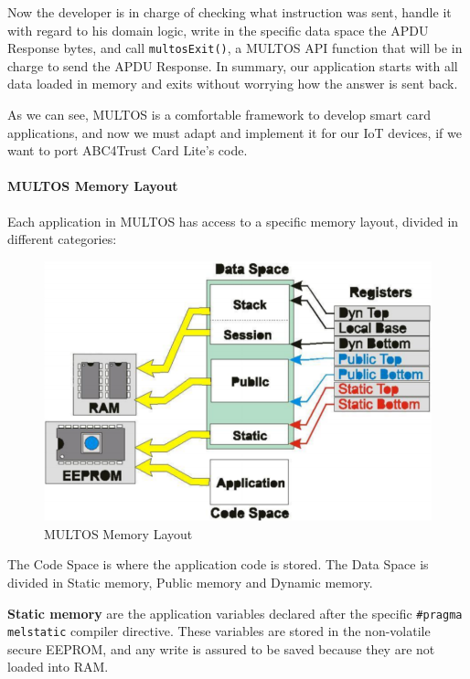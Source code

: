 Now the developer is in charge of checking what instruction was sent, handle it with regard to his domain logic,  write in the specific data space the APDU Response bytes, and call \texttt{multosExit()}, a MULTOS API function that will be in charge to send the APDU Response.
In summary, our application starts with all data loaded in memory and exits without worrying how the answer is sent back.

As we can see, MULTOS is a comfortable framework to develop smart card applications, and now we must adapt and implement it for our IoT devices, if we want to port ABC4Trust Card Lite's code.



\paragraph{MULTOS Memory Layout}

Each application in MULTOS has access to a specific memory layout, divided in different categories:

\begin{figure}[bth]
	\begin{center}
		\includegraphics[width=0.8\linewidth]{gfx/multosMemLay}
	\end{center}
	\caption{MULTOS Memory Layout}
	\label{fig:multosMemLay}
\end{figure}


The Code Space is where the application code is stored.
The Data Space is divided in Static memory, Public memory and Dynamic memory.

\textbf{Static memory} are the application variables declared after the specific \texttt{\#pragma melstatic} compiler directive. These variables are stored in the non-volatile secure EEPROM, and any write is assured to be saved because they are not loaded into RAM.

